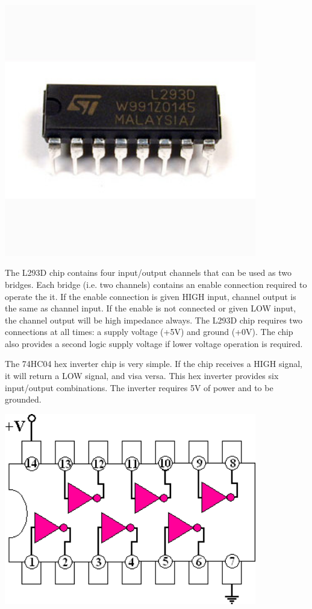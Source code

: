   \begin{minipage}{6.5in}
        \centering
    \includegraphics[width=110mm]{imageSources/hBridge.png}
  \label{hBridge}
\end{minipage}



The L293D chip contains four input/output channels that can be used as two bridges. Each bridge (i.e. two channels) contains an enable connection required to operate the it. If the enable connection is given HIGH input, channel output is the same as channel input. If the enable is not connected or given LOW input, the channel output will be high impedance always. The L293D chip requires two connections at all times: a supply voltage (+5V) and ground (+0V). The chip also provides a second logic supply voltage if lower voltage operation is required.

The 74HC04 hex inverter chip is very simple. If the chip receives a HIGH signal, it will return a LOW signal, and visa versa. This hex inverter provides six input/output combinations. The inverter requires 5V of power and to be grounded.

\begin{minipage}{6.5in}
  \centering
    \includegraphics[width=110mm]{imageSources/hexInverter.png}
  
  \label{hexInverter}
\end{minipage}

